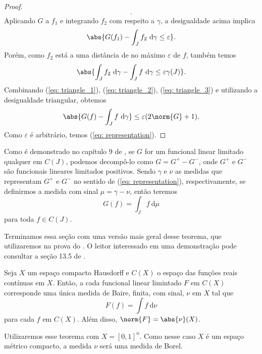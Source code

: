 \begin{proof}
\begin{align*}
    .\end{align*}
    Aplicando \( G \) a \( f_{ 1 } \) e integrando \( f_{ 2 } \) com respeito a \( \gamma \), a desigualdade acima implica
    \begin{equation}
        \abs{ 
            G(f_{ 1 }) - \int_{ J } f_{ 2 } \ \mathrm{d}\gamma
            \leq \varepsilon
         }
        \label{eq: triangle_2}
    .\end{equation}
    Porém, como \( f_{ 2 } \) está a uma distância de no máximo \( \varepsilon \) de \( f \), também temos
    \begin{equation}
        \abs{ 
            \int_{ J } f_{ 2 } \ \mathrm{d}\gamma
            - \int_{ J } f \ \mathrm{d}\gamma
            \leq \varepsilon \gamma(J)
         }
        \label{eq: triangle_3}
    .\end{equation}
    Combinando (\ref{eq: triangle_1}), (\ref{eq: triangle_2}), (\ref{eq: triangle_3}) e utilizando a desigualdade triangular, obtemos \[
        \abs{ G(f) - \int_{ J } f \ \mathrm{d}\gamma }
        \leq \varepsilon (2 \norm{ G } + 1)
    .\]
    Como \( \varepsilon \) é arbitrário, temos (\ref{eq: representation}).
\end{proof}

\begin{rem}
    Como é demonstrado no capítulo 9 de \cite{bartle}, se \( G \) for um funcional linear limitado qualquer em \( C(J) \), podemos decompô-lo como \( G = G^{ + } - G^{ - } \), onde \( G^{ + } \) e \( G^{ - } \) são funcionais lineares limitados positivos.
    Sendo \( \gamma \) e \( \nu \) as medidas que representam \( G^{ + } \) e \( G^{ - } \) no sentido de (\ref{eq: representation}), respectivamente, se definirmos a medida com sinal \( \mu = \gamma - \nu \), então teremos \[
        G(f) = \int_{ J } f \ \mathrm{d}\mu
    \]
    para toda \( f \in C(J) \).
\end{rem}

Terminamos essa seção com uma versão mais geral desse teorema, que utilizaremos na prova do \uat.
O leitor interessado em uma demonstração pode consultar a seção 13.5 de \cite{royden}.

\begin{Riesz}
    Seja \( X \) um espaço compacto Hausdorff e \( C(X) \) o espaço das funções reais contínuas em \( X \).
    Então, a cada funcional linear limintado \( F \) em \( C(X) \) corresponde uma única medida de Baire, finita, com sinal, \( \nu \) em \( X \) tal que \[
        F(f) = \int f \ \mathrm{d}\nu
    \]
    para cada \( f \) em \( C(X) \).
    Além disso, \( \norm{ F } = \abs{ \nu }(X) \).
\end{Riesz}

\begin{rem}
    Utilizaremos esse teorema com \( X = [0, 1]^{ n } \).
    Como nesse caso \( X \) é um espaço métrico compacto, a medida \( \nu \) será uma medida de Borel.
\end{rem}